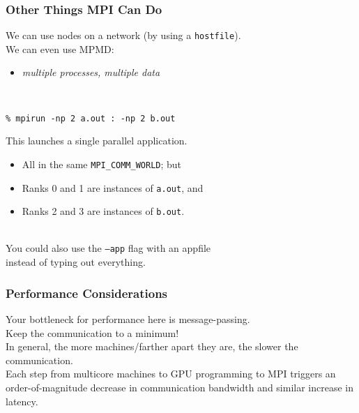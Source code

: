 \documentclass[aspectratio=43]{beamer}
\newenvironment{changemargin}[1]{%
  \begin{list}{}{%
    \setlength{\topsep}{0pt}%
    \setlength{\leftmargin}{#1}%
    \setlength{\rightmargin}{1em}
    \setlength{\listparindent}{\parindent}%
    \setlength{\itemindent}{\parindent}%
    \setlength{\parsep}{\parskip}%
  }%
  \item[]}{\end{list}}
\begin{document}
\begin{frame}[fragile]
  \frametitle{Other Things MPI Can Do}
  
  \begin{changemargin}{2cm}

    We can use nodes on a network (by using a {\tt hostfile}).\\[1em]
    We can even use MPMD:
      \begin{itemize}
        \item {\it multiple processes, multiple data}
      \end{itemize}~\\

  \begin{lstlisting}
% mpirun -np 2 a.out : -np 2 b.out
  \end{lstlisting}

  This launches a single parallel application.

  \begin{itemize}
    \item All in the same {\tt MPI\_COMM\_WORLD}; but
    \item Ranks 0 and 1 are instances of {\tt a.out}, and
    \item Ranks 2 and 3 are instances of {\tt b.out}.
  \end{itemize}~\\

  You could also use the {\tt --app} flag with an appfile \\ instead of typing out
  everything.
  \end{changemargin}
\end{frame}

\begin{frame}
  \frametitle{Performance Considerations}

  \begin{changemargin}{1cm}

 Your bottleneck for performance here is message-passing.\\[1em]
 Keep the communication to a minimum!\\[1em]
 In general, the more machines/farther apart they are, the slower the communication.\\[1em]

Each step from multicore
machines to GPU programming to MPI triggers an
order-of-magnitude decrease in communication bandwidth and  similar
increase in latency.
  \end{changemargin}
\end{frame}
\end{document}

